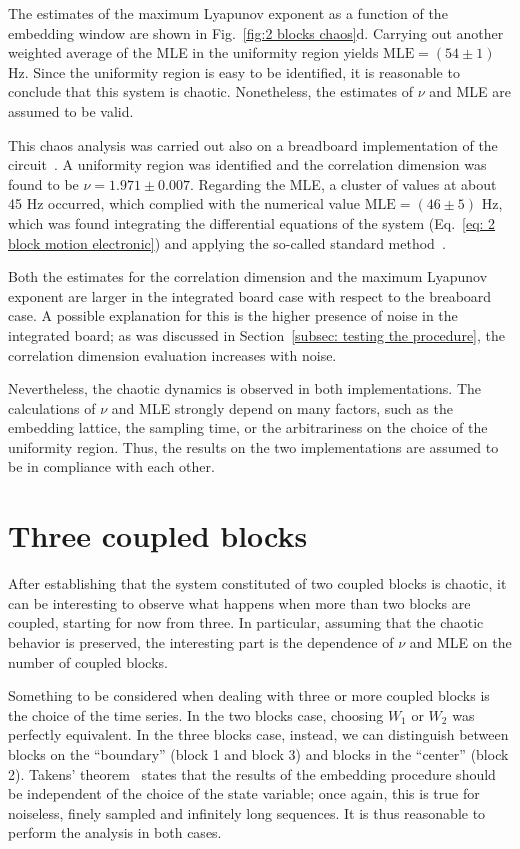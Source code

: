 The estimates of the maximum Lyapunov exponent as a function of the embedding window are shown in
Fig.~\ref{fig:2 blocks chaos}d. Carrying out another weighted average of the MLE in the uniformity region
yields $\text{MLE}=(54\pm1)$ Hz. Since the uniformity region is easy to be identified, it is reasonable
to conclude that this system is chaotic.
Nonetheless, the estimates of $\nu$ and MLE are assumed to be valid.

This chaos analysis was carried out also on a breadboard implementation of the circuit~\cite{ref:electronic_analog}.
A uniformity region was identified and the correlation dimension was found to be
$\nu=1.971\pm0.007$. Regarding the MLE, a cluster of values at about 45 Hz occurred, which complied
with the numerical value $\text{MLE}=(46\pm5)$ Hz, which was found integrating the differential
equations of the system (Eq.~\ref{eq: 2 block motion electronic}) and applying the so-called
standard method~\cite{benettin1980lyapunov1,benettin1980lyapunov2}.

Both the estimates for the correlation dimension and the maximum Lyapunov exponent are larger
in the integrated board case with respect to the breaboard case.
A possible explanation for this is the higher presence of noise in the integrated board;
as was discussed in Section~\ref{subsec: testing the procedure}, the correlation dimension evaluation
increases with noise.

Nevertheless, the chaotic dynamics is observed in both implementations. The calculations of $\nu$ and
MLE strongly depend on many factors, such as the embedding lattice, the sampling time, or the
arbitrariness on the choice of the uniformity region.
Thus, the results on the two implementations are assumed to be in compliance with each other.


\section{Three coupled blocks}\label{sec: 3 blocks chaos}

After establishing that the system constituted of two coupled blocks is chaotic, it can be interesting
to observe what happens when more than two blocks are coupled, starting for now from three.
In particular, assuming that the chaotic behavior is preserved, the interesting part is the dependence
of $\nu$ and MLE on the number of coupled blocks.

Something to be considered when dealing with three or more coupled blocks is the choice of the time series.
In the two blocks case, choosing $W_1$ or $W_2$ was perfectly equivalent.
In the three blocks case, instead, we can distinguish between blocks on the ``boundary'' (block 1 and
block 3) and blocks in the ``center'' (block 2). Takens' theorem~\cite{ref:takens2006detecting}
states that the results of the embedding procedure should be independent of the choice of the state
variable; once again, this is true for noiseless, finely sampled and infinitely long sequences.
It is thus reasonable to perform the analysis in both cases.



